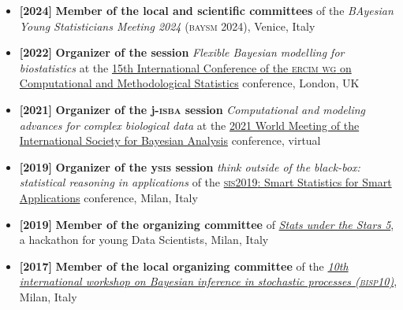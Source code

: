 \documentclass[10pt]{article}
\newenvironment{outerlist}[1][\enskip\tiny\textbullet]%
        {\begin{itemize}[#1]}{\end{itemize}%
         \vspace{-.6\baselineskip}}
\newcommand{\blankline}{\quad\pagebreak[2]}
\begin{document}
\begin{outerlist}

\item[\textbf{[2024]}] \textbf{Member of the local and scientific committees} of the \emph{BAyesian Young Statisticians Meeting 2024} (\textsc{baysm 2024}), Venice, Italy

\item[\textbf{[2022]}] \textbf{Organizer of the session} \emph{Flexible Bayesian modelling for biostatistics} at the \href{http://www.cmstatistics.org/CMStatistics2022/}{15th International Conference of the \textsc{ercim wg} on Computational and Methodological Statistics} conference, London, UK

\item[\textbf{[2021]}] \textbf{Organizer of the j-\textsc{isba} session} \emph{Computational and modeling advances for complex biological data} at the \href{https://events.stat.uconn.edu/ISBA2021/}{2021 World Meeting of the International Society for Bayesian Analysis} conference, virtual
\item[\textbf{[2019]}] \textbf{Organizer of the y\textsc{sis} session} \emph{think outside of the black-box: statistical reasoning in applications} of the \href{http://meetings3.sis-statistica.org/index.php/SIS2019/index/schedConfs/current}{\textsc{sis2019}: Smart Statistics for Smart Applications} conference, Milan, Italy
\item[\textbf{[2019]}]  \textbf{Member of the organizing committee} of \href{http://www.sus5.unibocconi.eu}{\emph{Stats under the Stars 5}}, a hackathon for young Data Scientists, Milan, Italy
\item[\textbf{[2017]}]  \textbf{Member of the local organizing committee} of the  \href{https://www.unibocconi.eu/wps/wcm/connect/Site/BISP10/Home/}{\emph{10th international workshop on Bayesian inference in stochastic processes (\textsc{bisp10})}}, Milan, Italy
\end{outerlist}
\blankline
\end{document}

